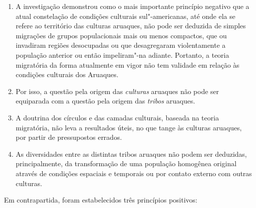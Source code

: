 \begin{enumerate}
\def\labelenumi{\arabic{enumi}.}
\item
  A investigação demonstrou como o mais importante princípio negativo
  que a atual constelação de condições culturais sul"-americanas, até
  onde ela se refere ao território das culturas aruaques, não pode ser
  deduzida de simples migrações de grupos populacionais mais ou menos
  compactos, que ou invadiram regiões desocupadas ou que desagregaram
  violentamente a população anterior ou então impeliram"-na adiante.
  Portanto, a teoria migratória da forma atualmente em vigor não tem
  validade em relação às condições culturais dos Aruaques.
\item
  Por isso, a questão pela origem das \textit{culturas} aruaques não pode ser
  equiparada com a questão pela origem das \textit{tribos} aruaques.
\item
  A doutrina dos círculos e das camadas culturais, baseada na
  teoria migratória, não leva a resultados úteis, no que tange às
  culturas aruaques, por partir de pressupostos errados.
\item
  As diversidades entre as distintas tribos aruaques não podem ser
  deduzidas, principalmente, da transformação de uma população
  homogênea original através de condições espaciais e temporais ou por
  contato externo com outras culturas.
\end{enumerate}

Em contrapartida, foram estabelecidos três princípios positivos:

